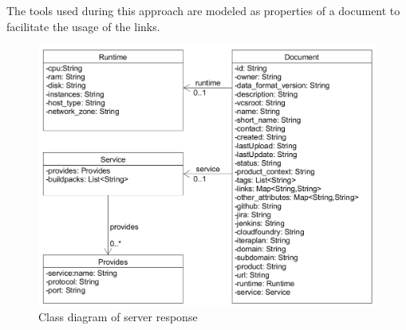 The tools used during this approach are modeled as properties of a document to facilitate the usage of the links. 

\begin{figure}[htpb]
  \centering
  \includegraphics[width=1.0\textwidth]{figures/pivio-classdiagram.PNG}
  \caption{Class diagram of server response}
  \label{fig:server-response}
\end{figure}














